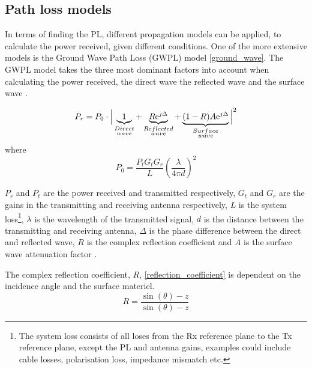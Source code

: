 \subsection{Path loss models}

In terms of finding the PL, different propagation models can be applied, to calculate the power received, given different conditions. One of the more extensive models is the Ground Wave Path Loss (GWPL) model \eqref{ground_wave}. The GWPL model takes the three most dominant factors into account when calculating the power received, the direct wave the reflected wave and the surface wave \cite{Chong,Bullington}.  


\begin{equation}
P_r=P_0 \cdot \Big|\underbrace{1}_{\begin{subarray}{c}Direct\\wave\end{subarray}}+\underbrace{R\text{e}^{j\Delta}}_{\begin{subarray}{c}Reflected\\wave\end{subarray}}+\underbrace{(1-R)A\text{e}^{j\Delta}}_{\begin{subarray}{c}Surface\\wave\end{subarray}}\Big|^2 
\label{ground_wave}
\end{equation}
where
\begin{equation}
P_0 = \frac{P_t G_t G_r}{L} \left(\frac{\lambda}{4 \pi d}\right)^2 
\label{ground_wave_P0}
\end{equation}

$P_{r}$ and $P_{t}$ are the power received and transmitted respectively, $G_t$ and $G_r$ are the gains in the transmitting and receiving antenna respectively, $L$ is the system loss\footnote{The system loss consists of all loses from the Rx reference plane to the Tx reference plane, except the PL and antenna gains, examples could include cable losses, polarisation loss, impedance mismatch etc.}, $\lambda$ is the wavelength of the transmitted signal, $d$ is the distance between the transmitting and receiving antenna, $\Delta$ is the phase difference between the direct and reflected wave, $R$ is the complex reflection coefficient and $A$ is the surface wave attenuation factor \cite{Chong,Bullington}. 


The complex reflection coefficient, $R$, \eqref{reflection_coefficient} is dependent on the incidence angle and the surface materiel.
\begin{equation}
R = \frac{\sin(\theta)-z}{\sin(\theta)-z}
\label{reflection_coefficient}
\end{equation}

